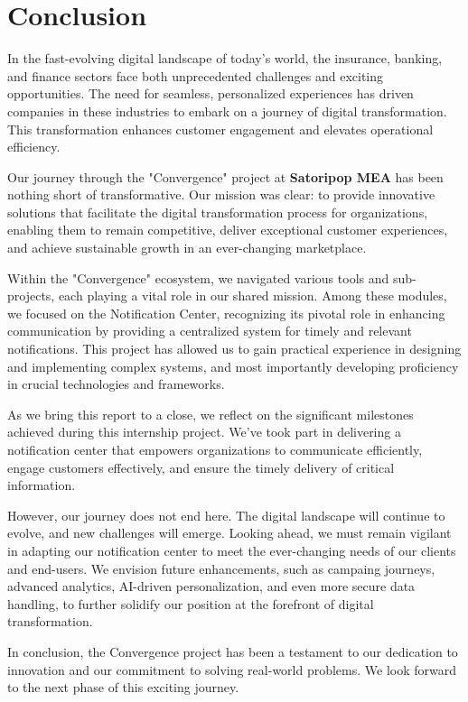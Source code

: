 \chapter*{Conclusion}
In the fast-evolving digital landscape of today's world, the insurance, banking, and finance sectors
face both unprecedented challenges and exciting opportunities. The need for seamless, personalized
experiences has driven companies in these industries to embark on a journey of digital transformation.
This transformation enhances customer engagement and elevates operational efficiency.

Our journey through the "Convergence" project at \textbf{Satoripop MEA} has been nothing short of transformative.
Our mission was clear: to provide innovative solutions that facilitate the digital transformation process
for organizations, enabling them to remain competitive, deliver exceptional customer experiences,
and achieve sustainable growth in an ever-changing marketplace.

Within the "Convergence" ecosystem, we navigated various tools and sub-projects, each playing a vital
role in our shared mission. Among these modules, we focused on the Notification Center, recognizing
its pivotal role in enhancing communication by providing a centralized system for timely and relevant
notifications. This project has allowed us to gain practical experience in designing and implementing
complex systems, and most importantly developing proficiency in crucial technologies and frameworks.

As we bring this report to a close, we reflect on the significant milestones achieved during this
internship project. We've took part in delivering a notification center that empowers organizations
to communicate efficiently, engage customers effectively, and ensure the timely delivery of critical
information.

However, our journey does not end here. The digital landscape will continue to evolve, and new
challenges will emerge. Looking ahead, we must remain vigilant in adapting our notification center
to meet the ever-changing needs of our clients and end-users. We envision future enhancements,
such as campaing journeys, advanced analytics, AI-driven personalization, and even more secure data handling,
to further solidify our position at the forefront of digital transformation.

In conclusion, the Convergence project has been a testament to our dedication to innovation and
our commitment to solving real-world problems. We look forward to the next phase of this exciting
journey.